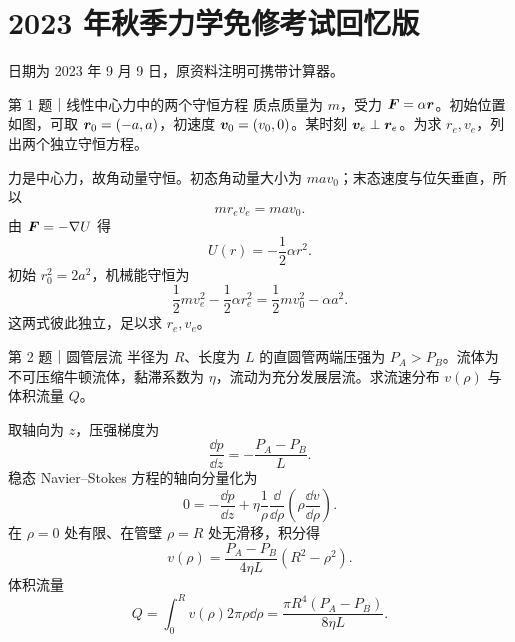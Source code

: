 \chapter{2023 年秋季力学免修考试回忆版}
\noindent{}\quad{}\qquad 日期为 2023 年 9 月 9 日，原资料注明可携带计算器。

\begin{problem}{第 1 题｜线性中心力中的两个守恒方程}
质点质量为 $m$，受力 $\bm{F}=\alpha\bm{r}$。初始位置如图，可取 $\bm{r}_0=(-a,a)$，初速度 $\bm{v}_0=(v_0,0)$。某时刻 $\bm{v}_e\perp\bm{r}_e$。为求 $r_e,v_e$，列出两个独立守恒方程。
\begin{center}\end{center}
\end{problem}
\begin{solution}
力是中心力，故角动量守恒。初态角动量大小为 $ma v_0$；末态速度与位矢垂直，所以
\[
\boxed{mr_ev_e=ma v_0}.
\]
由 $\bm{F}=-\nabla U$ 得
\[
U(r)=-\frac12\alpha r^2.
\]
初始 $r_0^2=2a^2$，机械能守恒为
\[
\boxed{\frac12mv_e^2-\frac12\alpha r_e^2
=\frac12mv_0^2-\alpha a^2}.
\]
这两式彼此独立，足以求 $r_e,v_e$。
\end{solution}

\begin{problem}{第 2 题｜圆管层流}
半径为 $R$、长度为 $L$ 的直圆管两端压强为 $P_A>P_B$。流体为不可压缩牛顿流体，黏滞系数为 $\eta$，流动为充分发展层流。求流速分布 $v(\rho)$ 与体积流量 $Q$。
\FigPoiseuille
\end{problem}
\begin{solution}
取轴向为 $z$，压强梯度为
\[
\frac{\dd p}{\dd z}=-\frac{P_A-P_B}{L}.
\]
稳态 Navier--Stokes 方程的轴向分量化为
\[
0=-\frac{\dd p}{\dd z}+\eta\frac1\rho\frac{\dd}{\dd\rho}
\left(\rho\frac{\dd v}{\dd\rho}\right).
\]
在 $\rho=0$ 处有限、在管壁 $\rho=R$ 处无滑移，积分得
\[
\boxed{v(\rho)=\frac{P_A-P_B}{4\eta L}(R^2-\rho^2)}.
\]
体积流量
\[
Q=\int_0^R v(\rho)2\pi\rho\dd\rho
=\boxed{\frac{\pi R^4(P_A-P_B)}{8\eta L}}.
\]
\end{solution}

